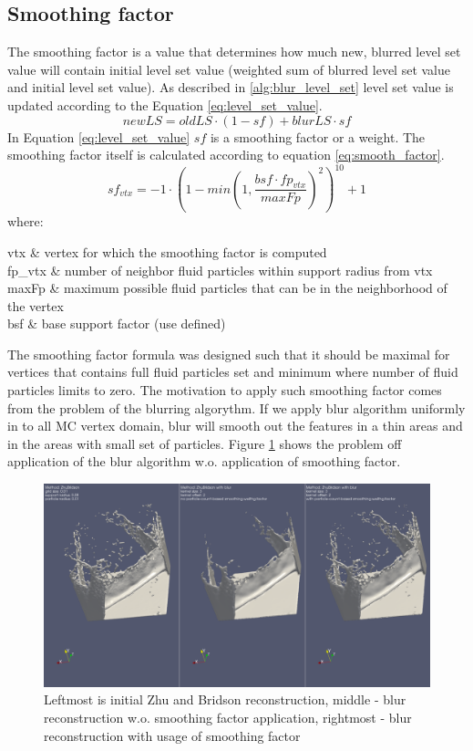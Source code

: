 \subsection{Smoothing factor}
The smoothing factor is a value that determines how much new, blurred level set value will contain initial level set value (weighted sum of blurred level set value and initial level set value). As described in \ref{alg:blur_level_set} level set value is updated according to the Equation \ref{eq:level_set_value}.
\begin{equation}
newLS = oldLS \cdot (1 - sf) + blurLS \cdot sf \label{eq:level_set_value}
\end{equation}
In Equation \ref{eq:level_set_value} $sf$ is a smoothing factor or a weight. The smoothing factor itself is calculated according to equation \ref{eq:smooth_factor}.
\begin{equation}
	sf_{vtx} = -1 \cdot (1 - min(1, \dfrac{bsf \cdot fp_{vtx}}{maxFp})^2)^{10} + 1 \label{eq:smooth_factor}
\end{equation}
where:
\begin{conditions}
	vtx & vertex for which the smoothing factor is computed\\
	fp_{vtx} & number of neighbor fluid particles within support radius from vtx\\
	maxFp & maximum possible fluid particles that can be in the neighborhood of the vertex \\
	bsf & base support factor (use defined)
\end{conditions}
The smoothing factor formula was designed such that it should be maximal for vertices that contains full fluid particles set and minimum where number of fluid particles limits to zero. The motivation to apply such smoothing factor comes from the problem of the blurring algorythm. If we apply blur algorithm uniformly in to all MC vertex domain,  blur will smooth out the features in a thin areas and in the areas with small set of particles. Figure \ref{fig:smoothing_factor_influence} shows the problem off application of the blur algorithm w.o. application of smoothing factor.


\begin{figure}[h]
	\begin{center}
			\includegraphics[width=\textwidth]{figures/View2.png}		
	\end{center}
	\caption{Leftmost is initial Zhu and Bridson reconstruction, middle - blur reconstruction w.o. smoothing factor application, rightmost - blur reconstruction with usage of smoothing factor}	
	\label{fig:smoothing_factor_influence}
\end{figure}
